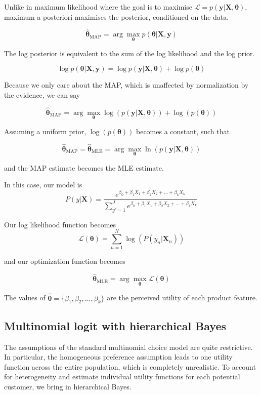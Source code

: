 \documentclass{article}
\begin{document}
Unlike in maximum likelihood where the goal is to maximise $\mathcal{L} = p(\textbf{y} | \textbf{X}, \boldsymbol{\theta})$, maximum a posteriori maximises the posterior, conditioned on the data. 

\[
\hat{\boldsymbol{\theta}}_{\text{MAP}} = \arg \max_{\boldsymbol{\theta}} p(\boldsymbol{\theta} | \mathbf{X}, \mathbf{y})
\]


The log posterior is equivalent to the sum of the log likelihood and the log prior.


\[
\log p(\boldsymbol{\theta} | \textbf{X}, \textbf{y}) = \log p(\textbf{y} | \textbf{X}, \boldsymbol{\theta}) + \log p(\boldsymbol{\theta})
\]

Because we only care about the MAP, which is unaffected by normalization by the evidence, we can say

\[
\hat{\boldsymbol{\theta}}_{\text{MAP}} = \arg \max_{\boldsymbol{\theta}} \log (p(\textbf{y} | \textbf{X}, \boldsymbol{\theta})) + \log (p(\boldsymbol{\theta}))
\]

Assuming a uniform prior, \( \log (p(\boldsymbol{\theta})) \) becomes a constant, such that

\[
\hat{\boldsymbol{\theta}}_{\text{MAP}} = \hat{\boldsymbol{\theta}}_{\text{MLE}} = \arg \max_{\boldsymbol{\theta}} \ln(p(\textbf{y} | \textbf{X}, \boldsymbol{\theta}))
\]


and the MAP estimate becomes the MLE estimate.

In this case, our model is 
\[
P(y|\textbf{X}) = \frac{e^{\beta_0 + \beta_1 X_1 + \beta_2 X_2 + \ldots + \beta_k X_k}}{\sum_{y'=1}^{J} e^{\beta_0 + \beta_1 X_1 + \beta_2 X_2 + \ldots + \beta_k X_k}}
\]

Our log likelihood function becomes
\[
\mathcal{L}(\boldsymbol{\theta}) = \sum_{n=1}^{N} \log \left( P(y_n|\textbf{X}_n) \right)
\]

and our optimization function becomes

\[
\hat{\boldsymbol{\theta}}_{\text{MLE}} = \arg \max_{\boldsymbol{\theta}} \mathcal{L}(\boldsymbol{\theta})
\]

The values of \( \hat{\boldsymbol{\theta}} = \{\beta_1, \beta_2, \ldots, \beta_k\} \) are the perceived utility of each product feature.


\subsection{Multinomial logit with hierarchical Bayes}

The assumptions of the standard multinomial choice model are quite restrictive. In particular, the homogeneous preference assumption leads to one utility function across the entire population, which is completely unrealistic. To account for heterogeneity and estimate individual utility functions for each potential customer, we bring in hierarchical Bayes. \\
\end{document}
